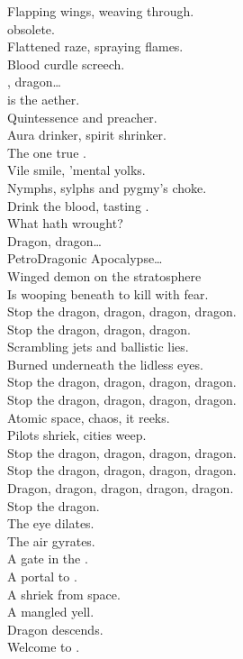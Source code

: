 Flapping wings, weaving through. \\
 obsolete. \\
Flattened raze, spraying flames. \\
Blood curdle screech. \\

, dragon… \\

 is the aether. \\
Quintessence and preacher. \\
Aura drinker, spirit shrinker. \\
The one true . \\
Vile smile, 'mental yolks. \\
Nymphs, sylphs and pygmy's choke. \\
Drink the blood, tasting . \\
What hath  wrought? \\

Dragon, dragon… \\

PetroDragonic Apocalypse… \\

Winged demon on the stratosphere \\
Is wooping beneath to kill with fear. \\
Stop the dragon, dragon, dragon, dragon. \\
Stop the dragon, dragon, dragon. \\

Scrambling jets and ballistic lies. \\
Burned underneath the lidless eyes. \\
Stop the dragon, dragon, dragon, dragon. \\
Stop the dragon, dragon, dragon, dragon. \\

Atomic space, chaos, it reeks. \\
Pilots shriek, cities weep. \\
Stop the dragon, dragon, dragon, dragon. \\
Stop the dragon, dragon, dragon, dragon. \\
Dragon, dragon, dragon, dragon, dragon. \\
Stop the dragon. \\

The eye dilates. \\
The air gyrates. \\
A gate in the . \\
A portal to . \\
A shriek from space. \\
A mangled yell. \\
Dragon descends. \\
Welcome to . \\

